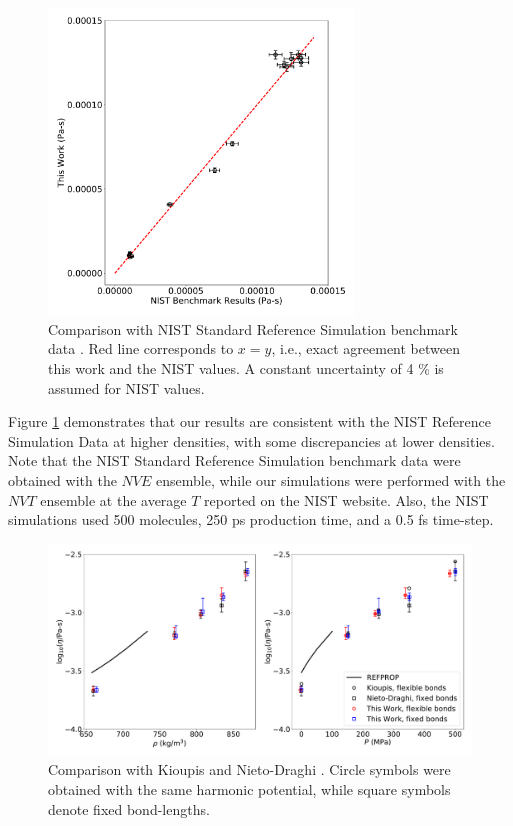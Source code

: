 \documentclass[preprint,review,11pt]{elsarticle}
\begin{document}
	
	\begin{figure}[htb!]
		\centering
		\includegraphics[width=3.2in]{NIST_ethane_TraPPE_validation.pdf}
		\caption{Comparison with NIST Standard Reference Simulation benchmark data \cite{NIST_SRSW}. Red line corresponds to $x = y$, i.e., exact agreement between this work and the NIST values. A constant uncertainty of 4 \% is assumed for NIST values.}
		\label{fig:validation_runs}
	\end{figure} 
	
	Figure \ref{fig:validation_runs} demonstrates that our results are consistent with the NIST Reference Simulation Data at higher densities, with some discrepancies at lower densities. Note that the NIST Standard Reference Simulation benchmark data were obtained with the $NVE$ ensemble, while our simulations were performed with the $NVT$ ensemble at the average $T$ reported on the NIST website. Also, the NIST simulations used 500 molecules, 250 ps production time, and a 0.5 fs time-step.  
	
	\begin{figure}[htb!]
		\centering
		\includegraphics[width=6.4in]{validation_TraPPE_octane.pdf}
		\caption{Comparison with Kioupis \cite{Kioupis2000} and Nieto-Draghi \cite{Nieto2006}. Circle symbols were obtained with the same harmonic potential, while square symbols denote fixed bond-lengths.}
		\label{fig:validation_runs2}
	\end{figure}
	
\end{document}
